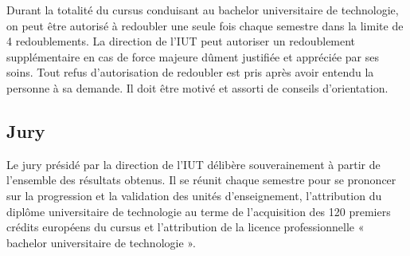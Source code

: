 \documentclass[10pt]{article}
\begin{document}
Durant la totalité du cursus conduisant au bachelor universitaire de
technologie, on peut être autorisé à redoubler une seule fois
chaque semestre dans la limite de 4 redoublements. La direction de l'IUT
peut autoriser un redoublement supplémentaire en cas de force majeure
dûment justifiée et appréciée par ses soins. Tout refus d'autorisation
de redoubler est pris après avoir entendu la personne à sa demande. Il
doit être motivé et assorti de conseils d'orientation.

\subsection{Jury}
Le jury présidé par la direction de l'IUT délibère souverainement à
partir de l'ensemble des résultats obtenus. Il se réunit chaque semestre
pour se prononcer sur la progression et la validation des unités
d'enseignement, l'attribution du diplôme universitaire de technologie au
terme de l'acquisition des 120 premiers crédits européens du cursus et
l'attribution de la licence professionnelle « bachelor universitaire de
technologie ».

\begin{minipage}{\linewidth}
  \tableofcontents
\end{minipage}
\end{document}
